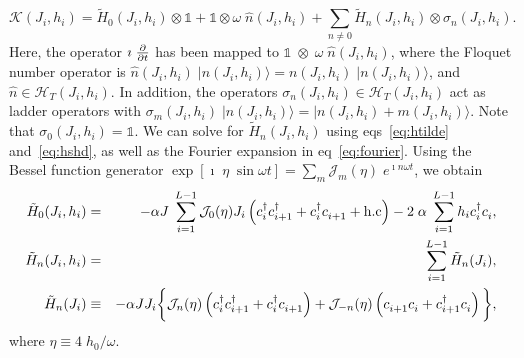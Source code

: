 \documentclass[a4paper,10pt]{article}
\begin{document}
\begin{equation}
\label{eq:floquetop}
\mathcal{K}(J_i,h_i) = \tilde{H}_0(J_i,h_i) \otimes \mathds{1} + \mathds{1}\otimes \omega \; \hat{n}(J_i,h_i)  + \sum_{n\neq 0} \tilde{H}_n(J_i,h_i)  \otimes \sigma_n(J_i,h_i).
\end{equation}
Here, the operator $\imath \; {\partial\over\partial t}  $ has been mapped to $\mathds{1}\;\otimes\; \omega\; \hat{n}(J_i,h_i) $, where the Floquet number operator is  $\hat{n}(J_i,h_i) \; |n(J_i,h_i) \rangle = n(J_i,h_i) \;|n(J_i,h_i) \rangle$, and $\hat{n}\in\mathcal{H}_T(J_i,h_i)$. In addition, the operators $\sigma_n(J_i,h_i) \in \mathcal{H}_T(J_i,h_i)$ act as ladder operators with $\sigma_m(J_i,h_i) \; |n(J_i,h_i) \rangle = |n(J_i,h_i) +m(J_i,h_i) \rangle$. Note that $\sigma_0 (J_i,h_i) = \mathds{1}$. We can solve for $\tilde{H}_n(J_i,h_i)$ using eqs~\ref{eq:htilde} and~\ref{eq:hshd}, as well as the Fourier expansion in eq~\ref{eq:fourier}. Using the Bessel function generator $\exp{\left[\imath \; \eta \; \sin{\omega t}\right]}=\sum_m \mathcal{J}_m(\eta)\; e^{\imath n \omega t}$, we obtain
\begin{eqnarray}
\label{eq:hn}
\tilde{H}_0(J_i,h_i) &  =   & -\alpha J\;\sum_{i=1}^{L-1} \mathcal{J}_0(\eta) J_i \left( c^\dagger_i c^\dagger_{i+1} + 						c^\dagger_i c^{\;}_{i+1} + \rm{h.c} \right) -2 \;\alpha\;\sum_{i=1}^{L-1} h_i c^\dagger_i c^{\;}_i,\nonumber \\ 
\tilde{H}_n(J_i,h_i) &  =   &  \sum_{i=1}^{L-1}  \tilde{H}_n(J_i),\nonumber \\
\tilde{H}_n(J_i)   &\equiv& -\alpha J J_i \bigg\{ \mathcal{J}_n(\eta)  \left( c^\dagger_i 		    c^\dagger_{i+1} + 					c^\dagger_i c^{\;}_{i+1} \right) +\mathcal{J}_{-n}(\eta) \left(c^{\;}_{i+1}c^{\;}_i + 		     						c^\dagger_{i+1} c^{\;}_{i} \right)\bigg\},
\end{eqnarray}
where $\eta\equiv4\; h_0/\omega$.
\end{document}
